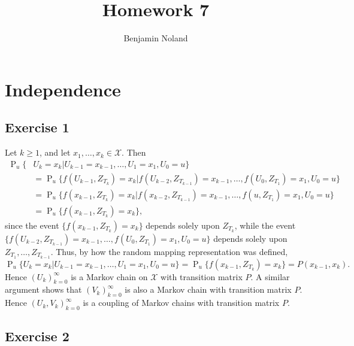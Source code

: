 \documentclass[12pt]{article}
\title{Homework 7}
\author{Benjamin Noland}
\date{}
\DeclareMathOperator{\Prob}{P}
\begin{document}
\maketitle

\section*{Independence}

\subsection*{Exercise 1}

Let $k \geq 1$, and let $x_1, \ldots, x_k \in \mathcal{X}$. Then
\begin{align*}
\Prob_u\{&U_k = x_k | U_{k-1} = x_{k-1}, \ldots, U_1 = x_1, U_0 = u\} \\
&= \Prob_u\{f(U_{k-1}, Z_{T_k}) = x_k | f(U_{k-2}, Z_{T_{k-1}}) = x_{k-1}, \ldots, f(U_0, Z_{T_1}) = x_1, U_0 = u\} \\
&= \Prob_u\{f(x_{k-1}, Z_{T_k}) = x_k | f(x_{k-2}, Z_{T_{k-1}}) = x_{k-1}, \ldots, f(u, Z_{T_1}) = x_1, U_0 = u\} \\
&= \Prob_u\{f(x_{k-1}, Z_{T_k}) = x_k\},
\end{align*}
since the event $\{f(x_{k-1}, Z_{T_k}) = x_k\}$ depends solely upon $Z_{T_k}$, while the event $\{f(U_{k-2}, Z_{T_{k-1}}) = x_{k-1}, \ldots, f(U_0, Z_{T_1}) = x_1, U_0 = u\}$ depends solely upon $Z_{T_1}, \ldots, Z_{T_{k-1}}$. Thus, by how the random mapping representation was defined,
\begin{equation*}
\Prob_u\{U_k = x_k | U_{k-1} = x_{k-1}, \ldots, U_1 = x_1, U_0 = u\} = \Prob_u\{f(x_{k-1}, Z_{T_k}) = x_k\} = P(x_{k-1}, x_k).
\end{equation*}
Hence $(U_k)_{k=0}^\infty$ is a Markov chain on $\mathcal{X}$ with transition matrix $P$. A similar argument shows that $(V_k)_{k=0}^\infty$ is also a Markov chain with transition matrix $P$. Hence $(U_k, V_k)_{k=0}^\infty$ is a coupling of Markov chains with transition matrix $P$.

\subsection*{Exercise 2}
\end{document}
